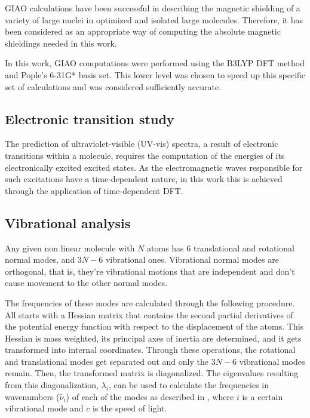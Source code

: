 GIAO calculations have been successful in describing the magnetic shielding of a variety of large nuclei in optimized and isolated large molecules.\cite{yuksek08} Therefore, it has been considered as an appropriate way of computing the absolute magnetic shieldings needed in this work.

In this work, GIAO computations were performed using the B3LYP DFT method and Pople's 6-31G* basis set.
This lower level was chosen to speed up this specific set of calculations and was considered sufficiently accurate.

\subsection{Electronic transition study}
The prediction of ultraviolet-visible (UV-vis) spectra, a result of electronic transitions within a molecule, requires the computation of the energies of its electronically excited excited states.
As the electromagnetic waves responsible for such excitations have a time-dependent nature, in this work this is achieved through the application of time-dependent DFT.

\subsection{Vibrational analysis}
Any given non linear molecule with $N$ atoms has 6 translational and rotational normal modes, and $3N-6$ vibrational ones.
Vibrational normal modes are orthogonal, that is, they're vibrational motions that are independent and don't cause movement to the other normal modes.

The frequencies of these modes are calculated through the following procedure.
All starts with a Hessian matrix that contains the second partial derivatives of the potential energy function with respect to the displacement of the atoms.
This Hessian is mass weighted, its principal axes of inertia are determined, and it gets transformed into internal coordinates.
Through these operations, the rotational and translational modes get separated out and only the $3N-6$ vibrational modes remain.
Then, the transformed matrix is diagonalized.
The eigenvalues resulting from this diagonalization, $\lambda_i$, can be used to calculate the frequencies in wavenumbers ($\tilde{\nu_i}$) of each of the modes as described in , where $i$ is a certain vibrational mode and $c$ is the speed of light.

